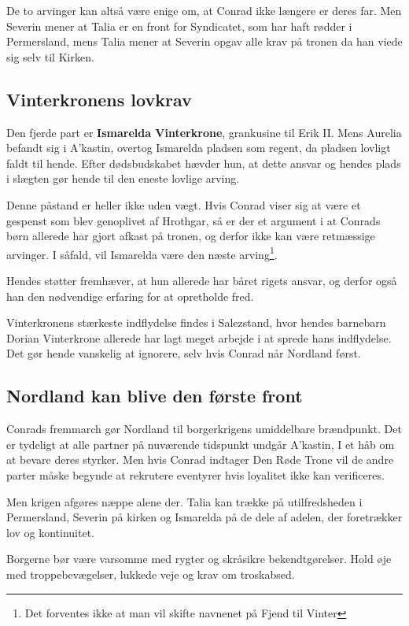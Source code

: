 \documentclass[a5paper,10pt,twoside,openany]{memoir}
\begin{document}
De to arvinger kan altså være enige om, at Conrad ikke længere er deres far. Men Severin mener at Talia er en front for Syndicatet, som har haft rødder i Permersland, mens Talia mener at Severin opgav alle krav på tronen da han viede sig selv til Kirken.

\subsection*{Vinterkronens lovkrav}

Den fjerde part er \textbf{Ismarelda Vinterkrone}, grankusine til Erik II. Mens Aurelia befandt sig i A'kastin, overtog Ismarelda pladsen som regent, da pladsen lovligt faldt til hende. Efter dødsbudskabet hævder hun, at dette ansvar og hendes plads i slægten gør hende til den eneste lovlige arving.

Denne påstand er heller ikke uden vægt. Hvis Conrad viser sig at være et gespenst som blev genoplivet af Hrothgar, så er der et argument i at Conrads børn allerede har gjort afkast på tronen, og derfor ikke kan være retmæssige arvinger. I såfald, vil Ismarelda være den næste arving\footnote{Det forventes ikke at man vil skifte navnenet på Fjend til Vinter}.

Hendes støtter fremhæver, at hun allerede har båret rigets ansvar, og derfor også han den nødvendige erfaring for at opretholde fred.

Vinterkronens stærkeste indflydelse findes i Salezstand, hvor hendes barnebarn Dorian Vinterkrone allerede har lagt meget arbejde i at sprede hans indflydelse. Det gør hende vanskelig at ignorere, selv hvis Conrad når Nordland først.

\subsection*{Nordland kan blive den første front}

Conrads fremmarch gør Nordland til borgerkrigens umiddelbare brændpunkt. Det er tydeligt at alle partner på nuværende tidspunkt undgår A'kastin, I et håb om at bevare deres styrker. Men hvis Conrad indtager Den Røde Trone vil de andre parter måske begynde at rekrutere eventyrer hvis loyalitet ikke kan verificeres.

Men krigen afgøres næppe alene der. Talia kan trække på utilfredsheden i Permersland, Severin på kirken og Ismarelda på de dele af adelen, der foretrækker lov og kontinuitet.

Borgerne bør være varsomme med rygter og skråsikre bekendtgørelser. Hold øje med troppebevægelser, lukkede veje og krav om troskabsed.
\end{document}
